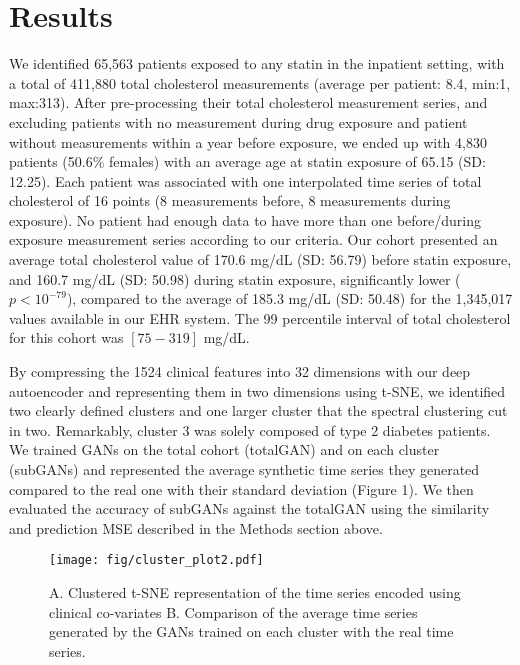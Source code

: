 \documentclass{article}
\begin{document}
\section{Results}

We identified 65,563 patients exposed to any statin in the inpatient setting, with a total of 411,880 total cholesterol measurements (average per patient: 8.4, min:1, max:313). After pre-processing their total cholesterol measurement series, and excluding patients with no measurement during drug exposure and patient without measurements within a year before exposure, we ended up with 4,830 patients (50.6\% females) with an average age at statin exposure of 65.15 (SD: 12.25). Each patient was associated with one interpolated time series of total cholesterol of 16 points (8 measurements before, 8 measurements during exposure). No patient had enough data to have more than one before/during exposure measurement series according to our criteria. Our cohort presented an average total cholesterol value of 170.6 mg/dL (SD: 56.79) before statin exposure, and 160.7 mg/dL (SD: 50.98) during statin exposure, significantly lower ($p<10^{-79}$), compared to the average of 185.3 mg/dL (SD: 50.48) for the 1,345,017 values available in our EHR system. The 99 percentile interval of total cholesterol for this cohort was $[75-319]$ mg/dL.

By compressing the 1524 clinical features into 32 dimensions with our deep autoencoder and representing them in two dimensions using t-SNE, we identified two clearly defined clusters and one larger cluster that the spectral clustering cut in two. Remarkably, cluster 3 was solely composed of type 2 diabetes patients. We trained GANs on the total cohort (totalGAN) and on each cluster (subGANs) and represented the average synthetic time series they generated compared to the real one with their standard deviation (Figure 1). We then evaluated the accuracy of subGANs against the totalGAN using the similarity and prediction MSE described in the Methods section above.
\begin{figure}[h]
  \centering
	\texttt{[image: fig/cluster\_plot2.pdf]}
  \caption{A. Clustered t-SNE representation of the time series encoded using clinical co-variates B. Comparison of the average time series generated by the GANs trained on each cluster with the real time series.}
  \vspace*{-1em}
\end{figure}
\end{document}
